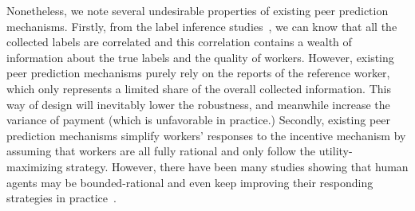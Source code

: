 Nonetheless, we note several undesirable properties of existing peer prediction mechanisms.
Firstly, from the label inference studies~\cite{zheng2017truth}, we can know that all the collected labels are correlated and this correlation contains a wealth of information about the true labels and the quality of workers.
However, existing peer prediction mechanisms purely rely on the reports of the reference worker, which only represents a limited share of the overall collected information.
This way of design will inevitably lower the robustness, and meanwhile increase the variance of payment (which is unfavorable in practice.)
Secondly, existing peer prediction mechanisms simplify workers' responses to the incentive mechanism by assuming that workers are all fully rational and only follow the utility-maximizing strategy.
However, there have been many studies showing that human agents may be bounded-rational and even keep improving their responding strategies in practice~\cite{simon1982models,mckelvey1995quantal,chastain2014algorithms}.

%
%
%



